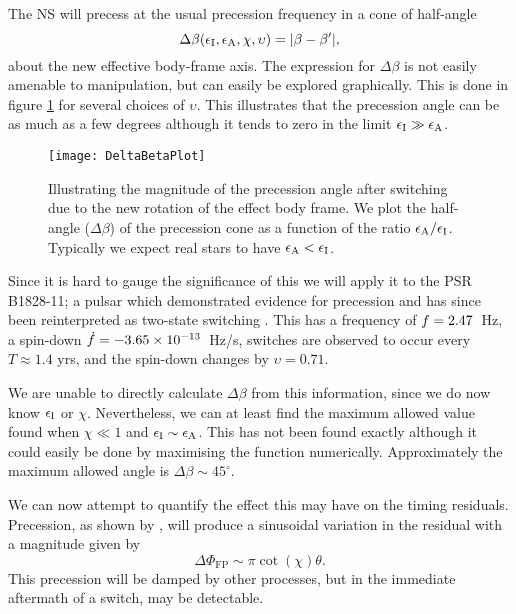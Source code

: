 \documentclass[../full_thesis/full_thesis.tex]{subfiles}
\begin{document}
The NS will precess at the usual precession frequency in a cone  of half-angle
\begin{equation}
    \Delta\beta(\epsilon_{\mathrm{I}}, \epsilon_{\mathrm{A}}, \chi, \upsilon)=|\beta - \beta'|,
\end{equation}
about the new effective body-frame axis.  The expression for $\Delta \beta$ is
not easily amenable to manipulation, but can easily be explored graphically.
This is done in figure \ref{fig: DeltaBetaPlot} for several choices of
$\upsilon$. This illustrates that the precession angle can be as much as a few
degrees although it tends to zero in the limit $\epsilon_{\mathrm{I}} \gg \epsilon_{\mathrm{A}}$.

\begin{figure}[htb]
    \centering
    \texttt{[image: DeltaBetaPlot]}
    \caption{Illustrating the magnitude of the precession angle after switching
        due to the new rotation of the effect body frame. We plot the half-angle
        ($\Delta\beta$) of the precession cone as a function of the ratio
    $\epsilon_{\mathrm{A}}/\epsilon_{\mathrm{I}}$. Typically we expect real stars to have $\epsilon_{\mathrm{A}} < \epsilon_{\mathrm{I}}$.}
    \label{fig: DeltaBetaPlot}
\end{figure}

Since it is hard to gauge the significance of this we will apply it to the
PSR B1828-11; a pulsar which demonstrated evidence for precession \citet{Stairs2000}
and has since been reinterpreted as two-state switching \citep{Lyne2010}. This
has a frequency of $f = 2.47$~Hz, a spin-down $\dot{f}=-3.65\times10^{-13}$~Hz/s, switches are
observed to occur every $T\approx 1.4$ yrs, and the spin-down changes by $\upsilon = 0.71$.

We are unable to directly calculate $\Delta\beta$ from this information, since
we do now know $\epsilon_{\mathrm{I}}$ or $\chi$. Nevertheless, we can at least find the maximum
allowed value found when $\chi \ll 1$ and $\epsilon_{\mathrm{I}} \sim \epsilon_{\mathrm{A}}$. This has not 
been found exactly although it could easily be done by maximising the function 
numerically. Approximately the maximum allowed angle is $\Delta\beta \sim 45^{\circ}$.

We can now attempt to quantify the effect this may have on the timing residuals.
Precession, as shown by \citet{Jones2001}, will produce a sinusoidal variation
in the residual with a magnitude given by 
\begin{equation}
    \Delta\Phi_{\mathrm{FP}} \sim \pi \cot(\chi) \theta.
\end{equation}
This precession will be damped by other processes, but in the immediate aftermath
of a switch, may be detectable. 
\end{document}
